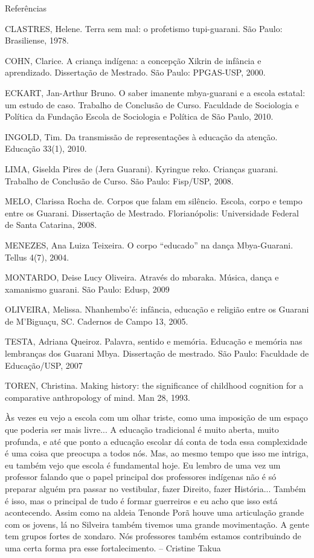 \documentclass{article}
\begin{document}
Refer\^encias

CLASTRES, Helene. Terra sem mal: o profetismo tupi-guarani. S\~ao Paulo:
Brasiliense, 1978.

COHN, Clarice. A crian\c{c}a ind\'igena: a concep\c{c}\~ao Xikrin de
inf\^ancia e aprendizado. Disserta\c{c}\~ao de Mestrado. S\~ao Paulo:
PPGAS-USP, 2000.

ECKART, Jan-Arthur Bruno. O saber imanente mbya-guarani e a escola
estatal: um estudo de caso. Trabalho de Conclus\~ao de Curso. Faculdade
de Sociologia e Pol\'itica da Funda\c{c}\~ao Escola de Sociologia e
Pol\'itica de S\~ao Paulo, 2010.

INGOLD, Tim. Da transmiss\~ao de representa\c{c}\~oes \`a educa\c{c}\~ao
da aten\c{c}\~ao. Educa\c{c}\~ao 33(1), 2010.

LIMA, Giselda Pires de (Jera Guarani). Kyringue reko. Crian\c{c}as
guarani. Trabalho de Conclus\~ao de Curso. S\~ao Paulo: Fisp/USP, 2008.

MELO, Clarissa Rocha de. Corpos que falam em sil\^encio. Escola, corpo e
tempo entre os Guarani.  Disserta\c{c}\~ao de Mestrado.
Florian\'opolis: Universidade Federal de Santa Catarina, 2008.

MENEZES, Ana Luiza Teixeira. O corpo
{\textquotedblleft}educado{\textquotedblright} na dan\c{c}a
Mbya-Guarani. Tellus 4(7), 2004.

MONTARDO, Deise Lucy Oliveira. Atrav\'es do mbaraka. M\'usica, dan\c{c}a
e xamanismo guarani. S\~ao Paulo: Edusp, 2009

OLIVEIRA, Melissa.  Nhanhembo{\textquoteright}\'e: inf\^ancia,
educa\c{c}\~ao e religi\~ao entre os Guarani de
M{\textquoteright}Bigua\c{c}u, SC. Cadernos de Campo 13, 2005.

TESTA, Adriana Queiroz. Palavra, sentido e mem\'oria. Educa\c{c}\~ao e
mem\'oria nas lembran\c{c}as dos Guarani Mbya. Disserta\c{c}\~ao de
mestrado. S\~ao Paulo: Faculdade de Educa\c{c}\~ao/USP, 2007

TOREN, Christina. Making history: the significance of childhood
cognition for a comparative anthropology of mind. Man 28, 1993.

\`As vezes eu vejo a escola com um olhar triste, como uma
imposi\c{c}\~ao de um espa\c{c}o que poderia ser mais livre... A
educa\c{c}\~ao tradicional \'e muito aberta, muito profunda, e at\'e
que ponto a educa\c{c}\~ao escolar d\'a conta de toda essa complexidade
\'e uma coisa que preocupa a todos n\'os. Mas, ao mesmo tempo que isso
me intriga, eu tamb\'em vejo que escola \'e fundamental hoje. Eu lembro
de uma vez um professor falando que o papel principal dos professores
ind\'igenas n\~ao \'e s\'o preparar algu\'em pra passar no vestibular,
fazer Direito, fazer Hist\'oria... Tamb\'em \'e isso, mas o principal
de tudo \'e formar guerreiros e eu acho que isso est\'a acontecendo.
Assim como na aldeia Tenonde Por\~a houve uma articula\c{c}\~ao grande
com os jovens, l\'a no Silveira tamb\'em tivemos uma grande
movimenta\c{c}\~ao. A gente tem grupos fortes de xondaro. N\'os
professores tamb\'em estamos contribuindo de uma certa forma pra esse
fortalecimento. -- Cristine Takua
\end{document}
